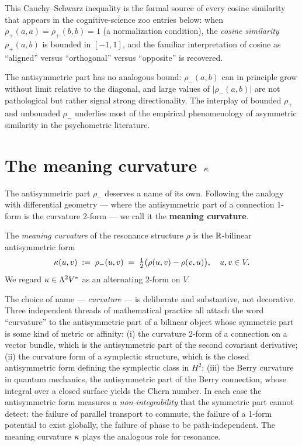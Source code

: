 This Cauchy--Schwarz inequality is the formal source of every cosine
similarity that appears in the cognitive-science zoo entries below: when
$\rho_+(a,a)=\rho_+(b,b)=1$ (a normalization condition), the
\emph{cosine similarity} $\rho_+(a,b)$ is bounded in $[-1,1]$, and the
familiar interpretation of cosine as ``aligned'' versus ``orthogonal''
versus ``opposite'' is recovered.

The antisymmetric part has no analogous bound: $\rho_-(a,b)$ can in
principle grow without limit relative to the diagonal, and large values
of $|\rho_-(a,b)|$ are not pathological but rather signal strong
directionality. The interplay of bounded $\rho_+$ and unbounded
$\rho_-$ underlies most of the empirical phenomenology of asymmetric
similarity in the psychometric literature.

\section{The meaning curvature $\kappa$}\label{sec:curvature}

The antisymmetric part $\rho_-$ deserves a name of its own. Following the
analogy with differential geometry --- where the antisymmetric part of a
connection 1-form is the curvature 2-form --- we call it the
\textbf{meaning curvature}.

\begin{definition}\label{def:curvature}
The \emph{meaning curvature} of the resonance structure $\rho$ is the
$\mathbb{R}$-bilinear antisymmetric form
\[
\kappa(u,v) \;:=\; \rho_-(u,v) \;=\; \tfrac12\bigl(\rho(u,v)-\rho(v,u)\bigr),
\quad u,v\in V.
\]
We regard $\kappa\in\Lambda^2 V^*$ as an alternating $2$-form on $V$.
\end{definition}

The choice of name --- \emph{curvature} --- is deliberate and substantive,
not decorative. Three independent threads of mathematical practice all
attach the word ``curvature'' to the antisymmetric part of a bilinear
object whose symmetric part is some kind of metric or affinity:
(i) the curvature 2-form of a connection on a vector bundle, which is the
antisymmetric part of the second covariant derivative; (ii) the curvature
form of a symplectic structure, which is the closed antisymmetric form
defining the symplectic class in $H^2$; (iii) the Berry curvature in
quantum mechanics, the antisymmetric part of the Berry connection, whose
integral over a closed surface yields the Chern number. In each case
the antisymmetric form measures a \emph{non-integrability} that the
symmetric part cannot detect: the failure of parallel transport to
commute, the failure of a 1-form potential to exist globally, the failure
of phase to be path-independent. The meaning curvature $\kappa$ plays the
analogous role for resonance.


